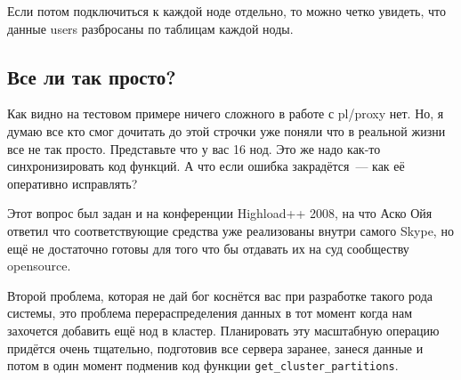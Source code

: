 Если потом подключиться к каждой ноде отдельно, то можно четко увидеть, что данные users разбросаны по таблицам каждой ноды.

\subsection{Все ли так просто?}

Как видно на тестовом примере ничего сложного в работе с pl/proxy нет. Но, я думаю все кто смог дочитать до этой строчки уже поняли что в реальной жизни все не так просто. Представьте что у вас 16 нод. Это же надо как-то синхронизировать код функций. А что если ошибка закрадётся~--- как её оперативно исправлять?

Этот вопрос был задан и на конференции Highload++ 2008, на что Аско Ойя ответил что соответствующие средства уже реализованы внутри самого Skype, но ещё не достаточно готовы для того что бы отдавать их на суд сообществу opensource.

Второй проблема, которая не дай бог коснётся вас при разработке такого рода системы, это проблема перераспределения данных в тот момент когда нам захочется добавить ещё нод в кластер. Планировать эту масштабную операцию придётся очень тщательно, подготовив все сервера заранее, занеся данные и потом в один момент подменив код функции \lstinline!get_cluster_partitions!.